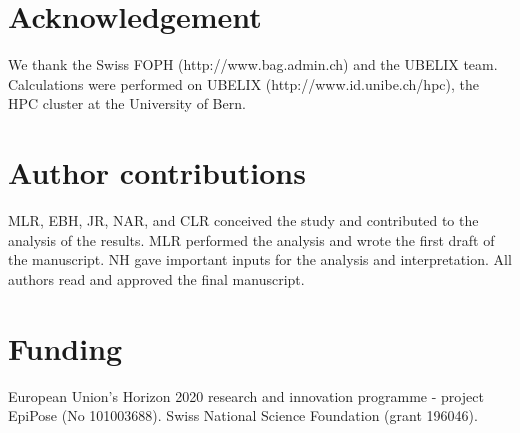 \documentclass[10pt, a4paper, twoside]{article}
\begin{document}
\begin{multicols}{2}
\section{Acknowledgement}
We thank the Swiss FOPH (http://www.bag.admin.ch) and the UBELIX team. Calculations were performed on UBELIX (http://www.id.unibe.ch/hpc), the HPC cluster at the University of Bern.

\section{Author contributions}
MLR, EBH, JR, NAR, and CLR conceived the study and contributed to the analysis of the results.
MLR performed the analysis and wrote the first draft of the manuscript.
NH gave important inputs for the analysis and interpretation.
All authors read and approved the final manuscript.

\section{Funding}
European Union’s Horizon 2020 research and innovation programme - project EpiPose (No 101003688). Swiss National Science Foundation (grant 196046).




\end{multicols}
\end{document}
